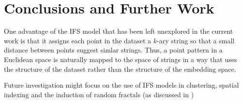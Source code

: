\documentclass{article}
\theoremstyle{definition}
\begin{document}
\section{Conclusions and Further Work}

One advantage of the IFS model that has been left unexplored in the current work is that it assigns each point in the dataset a $k$-ary string so that a small distance between points suggest simlar strings. Thus, a point pattern in a Euclidean space is naturally mapped to the space of strings in a way that uses the structure of the dataset rather than the structure of the embedding space.

Future investigation might focus on the use of IFS models in clustering, spatial indexing and the induction of random fractals (as discussed in \cite{})
\end{document}
